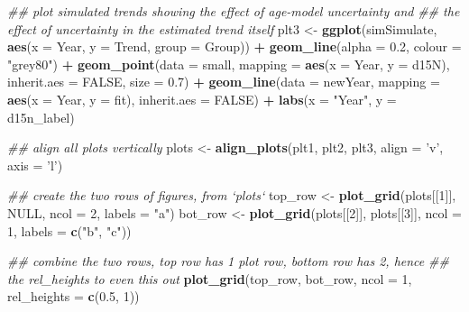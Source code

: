 \documentclass[12pt,]{article}
\newenvironment{Shaded}{\begin{snugshade}}{\end{snugshade}}
\newcommand{\CommentTok}[1]{\textcolor[rgb]{0.56,0.35,0.01}{\textit{#1}}}
\newcommand{\DataTypeTok}[1]{\textcolor[rgb]{0.13,0.29,0.53}{#1}}
\newcommand{\DecValTok}[1]{\textcolor[rgb]{0.00,0.00,0.81}{#1}}
\newcommand{\FloatTok}[1]{\textcolor[rgb]{0.00,0.00,0.81}{#1}}
\newcommand{\KeywordTok}[1]{\textcolor[rgb]{0.13,0.29,0.53}{\textbf{#1}}}
\newcommand{\NormalTok}[1]{#1}
\newcommand{\OperatorTok}[1]{\textcolor[rgb]{0.81,0.36,0.00}{\textbf{#1}}}
\newcommand{\OtherTok}[1]{\textcolor[rgb]{0.56,0.35,0.01}{#1}}
\newcommand{\StringTok}[1]{\textcolor[rgb]{0.31,0.60,0.02}{#1}}
\begin{document}
\begin{Shaded}
\begin{Highlighting}[]
\CommentTok{## plot simulated trends showing the effect of age-model uncertainty and}
\CommentTok{## the effect of uncertainty in the estimated trend itself}
\NormalTok{plt3 <-}\StringTok{ }\KeywordTok{ggplot}\NormalTok{(simSimulate, }\KeywordTok{aes}\NormalTok{(}\DataTypeTok{x =}\NormalTok{ Year, }\DataTypeTok{y =}\NormalTok{ Trend, }\DataTypeTok{group =}\NormalTok{ Group)) }\OperatorTok{+}
\StringTok{    }\KeywordTok{geom_line}\NormalTok{(}\DataTypeTok{alpha =} \FloatTok{0.2}\NormalTok{, }\DataTypeTok{colour =} \StringTok{"grey80"}\NormalTok{) }\OperatorTok{+}
\StringTok{    }\KeywordTok{geom_point}\NormalTok{(}\DataTypeTok{data =}\NormalTok{ small,}
               \DataTypeTok{mapping =} \KeywordTok{aes}\NormalTok{(}\DataTypeTok{x =}\NormalTok{ Year, }\DataTypeTok{y =}\NormalTok{ d15N),}
               \DataTypeTok{inherit.aes =} \OtherTok{FALSE}\NormalTok{,}
               \DataTypeTok{size =} \FloatTok{0.7}\NormalTok{) }\OperatorTok{+}
\StringTok{    }\KeywordTok{geom_line}\NormalTok{(}\DataTypeTok{data =}\NormalTok{ newYear,}
              \DataTypeTok{mapping =} \KeywordTok{aes}\NormalTok{(}\DataTypeTok{x =}\NormalTok{ Year, }\DataTypeTok{y =}\NormalTok{ fit),}
              \DataTypeTok{inherit.aes =} \OtherTok{FALSE}\NormalTok{) }\OperatorTok{+}
\StringTok{    }\KeywordTok{labs}\NormalTok{(}\DataTypeTok{x =} \StringTok{"Year"}\NormalTok{, }\DataTypeTok{y =}\NormalTok{ d15n_label)}

\CommentTok{## align all plots vertically}
\NormalTok{plots <-}\StringTok{ }\KeywordTok{align_plots}\NormalTok{(plt1, plt2, plt3, }\DataTypeTok{align =} \StringTok{'v'}\NormalTok{, }\DataTypeTok{axis =} \StringTok{'l'}\NormalTok{)}


\CommentTok{## create the two rows of figures, from `plots`}
\NormalTok{top_row <-}\StringTok{ }\KeywordTok{plot_grid}\NormalTok{(plots[[}\DecValTok{1}\NormalTok{]], }\OtherTok{NULL}\NormalTok{, }\DataTypeTok{ncol =} \DecValTok{2}\NormalTok{, }\DataTypeTok{labels =} \StringTok{"a"}\NormalTok{)}
\NormalTok{bot_row <-}\StringTok{ }\KeywordTok{plot_grid}\NormalTok{(plots[[}\DecValTok{2}\NormalTok{]], plots[[}\DecValTok{3}\NormalTok{]], }\DataTypeTok{ncol =} \DecValTok{1}\NormalTok{, }\DataTypeTok{labels =} \KeywordTok{c}\NormalTok{(}\StringTok{"b"}\NormalTok{, }\StringTok{"c"}\NormalTok{))}

\CommentTok{## combine the two rows, top row has 1 plot row, bottom row has 2, hence}
\CommentTok{## the rel_heights to even this out}
\KeywordTok{plot_grid}\NormalTok{(top_row, bot_row, }\DataTypeTok{ncol =} \DecValTok{1}\NormalTok{, }\DataTypeTok{rel_heights =} \KeywordTok{c}\NormalTok{(}\FloatTok{0.5}\NormalTok{, }\DecValTok{1}\NormalTok{))}
\end{Highlighting}
\end{Shaded}
\end{document}
